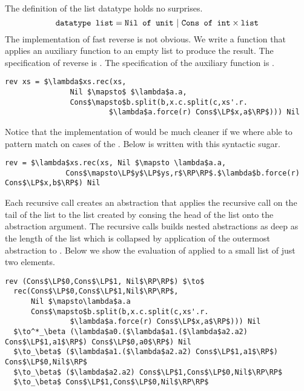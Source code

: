 \paragraph{}
The definition of the list datatype holds no surprises.
%
\[
  \texttt{datatype list} = \texttt{Nil of unit}\ |\ \texttt{Cons of int} \times \texttt{list}
\]
%
The implementation of fast reverse is not obvious. We write a function 
that applies an auxiliary function to an empty list to produce the result.  The
specification of reverse is . The specification of the auxiliary function
 is .
%
\begin{lstlisting}
rev xs = $\lambda$xs.rec(xs,
               Nil $\mapsto$ $\lambda$a.a,
               Cons$\mapsto$b.split(b,x.c.split(c,xs'.r.
                        $\lambda$a.force(r) Cons$\LP$x,a$\RP$))) Nil
\end{lstlisting}
%
Notice that the implementation of  would be much cleaner if we where
able to pattern match on cases of the . Below is  written with
this syntactic sugar.
%
\begin{lstlisting}
rev = $\lambda$xs.rec(xs, Nil $\mapsto \lambda$a.a,
              Cons$\mapsto\LP$y$\LP$ys,r$\RP\RP$.$\lambda$b.force(r) Cons$\LP$x,b$\RP$) Nil
\end{lstlisting}
%
Each recursive call creates an abstraction that applies the recursive call on
the tail of the list to the list created by consing the head of the list onto
the abstraction argument. The recursive calls builds nested abstractions as
deep as the length of the list which is collapsed by application of the
outermost abstraction to . Below we show the evaluation of 
applied to a small list of just two elements.
%
\begin{lstlisting}
rev (Cons$\LP$0,Cons$\LP$1, Nil$\RP\RP$) $\to$
  rec(Cons$\LP$0,Cons$\LP$1,Nil$\RP\RP$,
      Nil $\mapsto\lambda$a.a
      Cons$\mapsto$b.split(b,x.c.split(c,xs'.r.
               $\lambda$a.force(r) Cons$\LP$x,a$\RP$))) Nil
  $\to^*_\beta (\lambda$a0.($\lambda$a1.($\lambda$a2.a2) Cons$\LP$1,a1$\RP$) Cons$\LP$0,a0$\RP$) Nil
  $\to_\beta$ ($\lambda$a1.($\lambda$a2.a2) Cons$\LP$1,a1$\RP$) Cons$\LP$0,Nil$\RP$
  $\to_\beta$ ($\lambda$a2.a2) Cons$\LP$1,Cons$\LP$0,Nil$\RP\RP$
  $\to_\beta$ Cons$\LP$1,Cons$\LP$0,Nil$\RP\RP$
\end{lstlisting}
%
